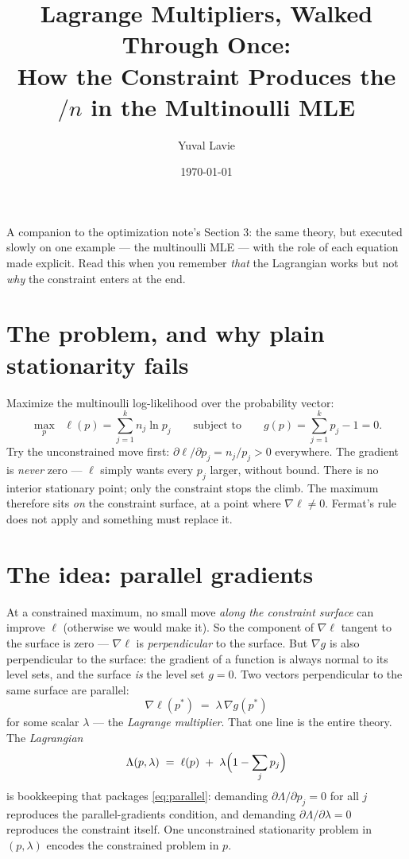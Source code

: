 \documentclass[11pt]{article}
\title{Lagrange Multipliers, Walked Through Once:\\
How the Constraint Produces the $/n$ in the Multinoulli MLE}
\author{Yuval Lavie}
\date{\today}
\begin{document}
\maketitle

\noindent
A companion to the optimization note's Section 3: the same theory, but
executed slowly on one example --- the multinoulli MLE --- with the
role of each equation made explicit. Read this when you remember
\emph{that} the Lagrangian works but not \emph{why} the constraint
enters at the end.

\section{The problem, and why plain stationarity fails}

Maximize the multinoulli log-likelihood over the probability vector:
\begin{equation}
  \max_{p}\;\; \ell(p) = \sum_{j=1}^{k} n_j \ln p_j
  \qquad\text{subject to}\qquad
  g(p) = \sum_{j=1}^{k} p_j - 1 = 0 .
  \label{eq:problem}
\end{equation}
Try the unconstrained move first:
$\partial \ell / \partial p_j = n_j / p_j > 0$ everywhere. The gradient
is \emph{never} zero --- $\ell$ simply wants every $p_j$ larger, without
bound. There is no interior stationary point; only the constraint stops
the climb. The maximum therefore sits \emph{on} the constraint surface,
at a point where $\nabla\ell \ne 0$. Fermat's rule does not apply and
something must replace it.

\section{The idea: parallel gradients}

At a constrained maximum, no small move \emph{along the constraint
surface} can improve $\ell$ (otherwise we would make it). So the
component of $\nabla\ell$ tangent to the surface is zero ---
$\nabla\ell$ is \emph{perpendicular} to the surface. But $\nabla g$ is
also perpendicular to the surface: the gradient of a function is always
normal to its level sets, and the surface \emph{is} the level set
$g = 0$. Two vectors perpendicular to the same surface are parallel:
\begin{equation}
  \boxed{\;\nabla \ell(p^\ast) \;=\; \lambda\, \nabla g(p^\ast)\;}
  \label{eq:parallel}
\end{equation}
for some scalar $\lambda$ --- the \emph{Lagrange multiplier}. That one
line is the entire theory. The \emph{Lagrangian}
\begin{equation}
  \Lambda(p, \lambda)
  \;=\; \ell(p) \;+\; \lambda\Bigl(1 - \sum_j p_j\Bigr)
  \label{eq:lagrangian}
\end{equation}
is bookkeeping that packages \eqref{eq:parallel}: demanding
$\partial \Lambda / \partial p_j = 0$ for all $j$ reproduces the
parallel-gradients condition, and demanding
$\partial \Lambda / \partial \lambda = 0$ reproduces the constraint
itself. One unconstrained stationarity problem in $(p, \lambda)$
encodes the constrained problem in $p$.
\end{document}
